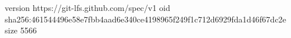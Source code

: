 version https://git-lfs.github.com/spec/v1
oid sha256:461544496e58e7fbb4aad6e340ce4198965f249f1c712d6929fda1d46f67dc2e
size 5566
